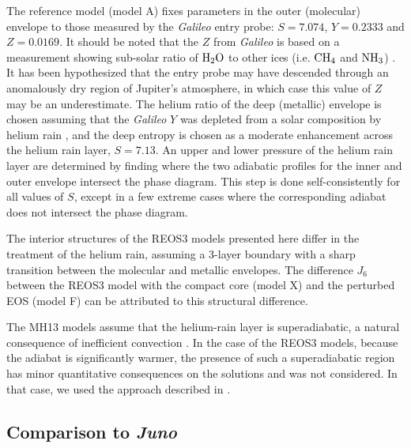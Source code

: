 The reference model (model A) fixes parameters in the outer (molecular) envelope to those
measured by the \textit{Galileo} entry probe: $S=7.074$, $Y=0.2333$ and $Z=0.0169$.
It should be noted that the $Z$ from \textit{Galileo} is based on a measurement
showing sub-solar ratio of ${\rm H}_2{\rm O}$ to other ices (i.e. ${\rm CH}_4$ and
${\rm NH}_3$) \citep{Wong2004}. It has been hypothesized that the entry probe may
have descended through an anomalously dry region of Jupiter's atmosphere, in which
case this value of $Z$ may be an underestimate. The helium ratio of the deep
(metallic) envelope is chosen assuming that the \textit{Galileo} $Y$ was depleted
from a solar composition by helium rain , and the deep entropy is chosen as a
moderate enhancement across the helium rain layer, $S=7.13$.  An upper and lower
pressure of the helium rain layer are determined by finding where the two adiabatic
profiles for the inner and outer envelope intersect the \citep{morales2013} phase
diagram. This step is done self-consistently for all values of $S$, except in a few
extreme cases where the corresponding adiabat does not intersect the phase diagram. 

The interior structures of the REOS3 models presented here differ in the treatment of
the helium rain, assuming a 3-layer boundary with a sharp transition between the
molecular and metallic envelopes. The difference $J_6$ between the REOS3 model with
the compact core (model X) and the perturbed EOS (model F) can be attributed to this
structural difference. 

The MH13 models assume that the helium-rain layer is
superadiabatic, a natural consequence of inefficient convection
\citep{militzer2016}. In the case of the REOS3 models, because the adiabat is
significantly warmer, the presence of such a superadiabatic region has minor
quantitative consequences on the solutions and was not considered. In that
case, we used the approach described in \citet{miguel2016}.  

\subsection{Comparison to \textit{Juno}} \label{sec:comparison}


